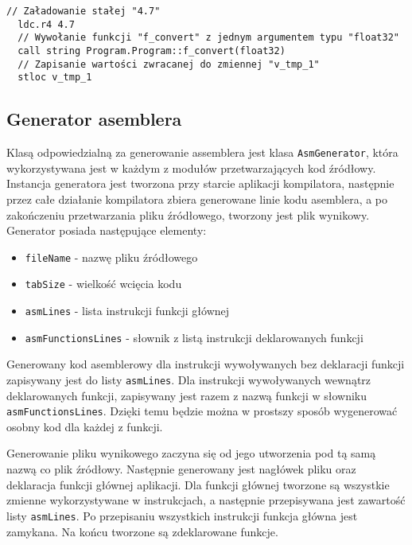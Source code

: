 \begin{lstlisting}[language=IL, caption={Kod assemblera przedstawiający wywołanie funkcji}, label=alg:f1]
  // Załadowanie stałej "4.7"
  ldc.r4 4.7
  // Wywołanie funkcji "f_convert" z jednym argumentem typu "float32"
  call string Program.Program::f_convert(float32)
  // Zapisanie wartości zwracanej do zmiennej "v_tmp_1"
  stloc v_tmp_1
\end{lstlisting}

\subsection{Generator asemblera}

\par Klasą odpowiedzialną za generowanie assemblera jest klasa \texttt{AsmGenerator}, która wykorzystywana jest w każdym z modułów przetwarzających kod źródłowy. Instancja generatora jest tworzona przy starcie aplikacji kompilatora, następnie przez całe działanie kompilatora zbiera generowane linie kodu asemblera, a po zakończeniu przetwarzania pliku źródłowego, tworzony jest plik wynikowy. Generator posiada następujące elementy:
\begin{itemize}
  \item \texttt{fileName} - nazwę pliku źródłowego
  \item \texttt{tabSize} - wielkość wcięcia kodu
  \item \texttt{asmLines} - lista instrukcji funkcji głównej
  \item \texttt{asmFunctionsLines} - słownik z listą instrukcji deklarowanych funkcji
\end{itemize}

\par Generowany kod asemblerowy dla instrukcji wywoływanych bez deklaracji funkcji zapisywany jest do listy \texttt{asmLines}. Dla instrukcji wywoływanych wewnątrz deklarowanych funkcji, zapisywany jest razem z nazwą funkcji w słowniku \texttt{asmFunctionsLines}. Dzięki temu będzie można w prostszy sposób wygenerować osobny kod dla każdej z funkcji.
\par Generowanie pliku wynikowego zaczyna się od jego utworzenia pod tą samą nazwą co plik źródłowy. Następnie generowany jest nagłówek pliku oraz deklaracja funkcji głównej aplikacji. Dla funkcji głównej tworzone są wszystkie zmienne wykorzystywane w instrukcjach, a następnie przepisywana jest zawartość listy \texttt{asmLines}. Po przepisaniu wszystkich instrukcji funkcja główna jest zamykana. Na końcu tworzone są zdeklarowane funkcje.

